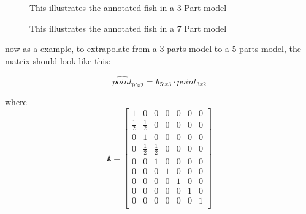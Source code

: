 \begin{figure}
\begin{adjustwidth}{-1in}{-1in} 
\label{fig:anotated1}
\centering     %
{}
\caption{This illustrates the annotated fish in a 3 Part model}
\end{adjustwidth}
\end{figure}

\begin{figure}
\begin{adjustwidth}{-1in}{-1in} 
\label{fig:anotated1}
\centering     %
{}
\caption{This illustrates the annotated fish in a 7 Part model}
\end{adjustwidth}
\end{figure}

now as a example, to extrapolate from a 3 parts model to a 5 parts model, the matrix
should look like this:


\begin{equation}
\hat{point}_{9'x2} =\mathtt{A}_{5'x3} \cdot point_{3x2}
\end{equation}

where
 \begin{equation}
 \label{eq:extrapole}
\mathtt{A} =
\begin{bmatrix}
1  & 0 & 0 & 0 & 0 & 0 & 0 \\
\frac{1}{2} & \frac{1}{2}  & 0 & 0 & 0 & 0 & 0 \\
0 & 1  & 0 & 0 & 0 & 0 & 0  \\
0 & \frac{1}{2} & \frac{1}{2} & 0 & 0 & 0 & 0 \\
0  & 0 & 1 & 0 & 0 & 0 & 0  \\
0  & 0 & 0 & 1 & 0 & 0 & 0  \\
0  & 0 & 0 & 0 & 1 & 0 & 0 \\
0  & 0 & 0 & 0 & 0 & 1 & 0 \\
0  & 0 & 0 & 0 & 0 & 0 & 1  \\
\end{bmatrix}
 \end{equation}

